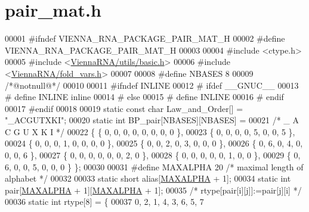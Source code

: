 \hypertarget{pair__mat_8h_source}{}\section{pair\+\_\+mat.\+h}
\label{pair__mat_8h_source}

\begin{DoxyCode}
00001 \textcolor{preprocessor}{#ifndef VIENNA\_RNA\_PACKAGE\_PAIR\_MAT\_H}
00002 \textcolor{preprocessor}{#define VIENNA\_RNA\_PACKAGE\_PAIR\_MAT\_H}
00003 
00004 \textcolor{preprocessor}{#include <ctype.h>}
00005 \textcolor{preprocessor}{#include <\hyperlink{utils_2basic_8h}{ViennaRNA/utils/basic.h}>}
00006 \textcolor{preprocessor}{#include <\hyperlink{fold__vars_8h}{ViennaRNA/fold\_vars.h}>}
00007 
00008 \textcolor{preprocessor}{#define NBASES 8}
00009 \textcolor{comment}{/*@notnull@*/}
00010 
00011 \textcolor{preprocessor}{#ifndef INLINE}
00012 \textcolor{preprocessor}{# ifdef \_\_GNUC\_\_}
00013 \textcolor{preprocessor}{#  define INLINE inline}
00014 \textcolor{preprocessor}{# else}
00015 \textcolor{preprocessor}{#  define INLINE}
00016 \textcolor{preprocessor}{# endif}
00017 \textcolor{preprocessor}{#endif}
00018 
00019 \textcolor{keyword}{static} \textcolor{keyword}{const} \textcolor{keywordtype}{char} Law\_and\_Order[]         = \textcolor{stringliteral}{"\_ACGUTXKI"};
00020 \textcolor{keyword}{static} \textcolor{keywordtype}{int}        BP\_pair[NBASES][NBASES] =
00021   \textcolor{comment}{/* \_  A  C  G  U  X  K  I */}
00022 \{ \{ 0, 0, 0, 0, 0, 0, 0, 0 \},
00023   \{ 0, 0, 0, 0, 5, 0, 0, 5 \},
00024   \{ 0, 0, 0, 1, 0, 0, 0, 0 \},
00025   \{ 0, 0, 2, 0, 3, 0, 0, 0 \},
00026   \{ 0, 6, 0, 4, 0, 0, 0, 6 \},
00027   \{ 0, 0, 0, 0, 0, 0, 2, 0 \},
00028   \{ 0, 0, 0, 0, 0, 1, 0, 0 \},
00029   \{ 0, 6, 0, 0, 5, 0, 0, 0 \} \};
00030 
00031 \textcolor{preprocessor}{#define MAXALPHA 20       }\textcolor{comment}{/* maximal length of alphabet */}\textcolor{preprocessor}{}
00032 
00033 \textcolor{keyword}{static} \textcolor{keywordtype}{short}  alias[\hyperlink{group__model__details_ga05a5ffe718aa431d97419a12fb082379}{MAXALPHA} + 1];
00034 \textcolor{keyword}{static} \textcolor{keywordtype}{int}    pair[\hyperlink{group__model__details_ga05a5ffe718aa431d97419a12fb082379}{MAXALPHA} + 1][\hyperlink{group__model__details_ga05a5ffe718aa431d97419a12fb082379}{MAXALPHA} + 1];
00035 \textcolor{comment}{/* rtype[pair[i][j]]:=pair[j][i] */}
00036 \textcolor{keyword}{static} \textcolor{keywordtype}{int}    rtype[8] = \{
00037   0, 2, 1, 4, 3, 6, 5, 7

\end{DoxyCode}
